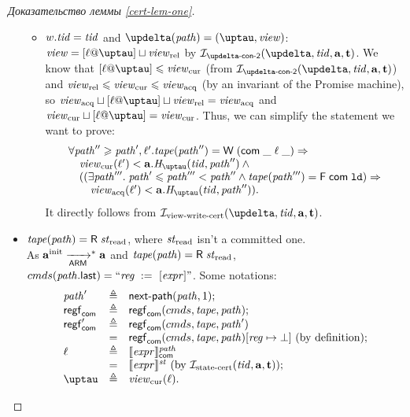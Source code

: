 \begin{proof}[Доказательство леммы \ref{cert-lem-one}]
\begin{itemize}
\begin{itemize}
        \item $w.\mathit{tid} = \mathit{tid}$ and $\delta(\cpath) = (\tau, \R)$: \\
          $\R = [\loc @ \tau] \sqcup \Rrel$ by $\invDeltaDefTwo(\delta, \tId, \aT, \tT)$.
          We know that $[\loc @ \tau] \le \Rcur$ (from $\invDeltaDefTwo(\delta, \tId, \aT, \tT)$) and $\mathit{view}_{\mathrm{rel}} \leqslant \mathit{view}_{\mathrm{cur}} \leqslant \mathit{view}_{\mathrm{acq}}$
          (by an invariant of the Promise machine), so $\Racq \sqcup [\loc @ \tau] \sqcup \Rrel = \Racq$ and
          $\Rcur \sqcup [\loc @ \tau] = \Rcur$.
          Thus, we can simplify the statement we want to prove:
      \[\begin{array}{l}
        \forall \cpath'' \ge \cpath', \loc'. \tape(\cpath'') = \tapeWrite{(\tapeWriteCommitted{\_}{\loc}{\_})} \Rightarrow \\
        \quad \Rcur(\loc') < \aT.\tmap(\tId, \cpath'') \land {} \\
        \quad ((\exists \cpath'''. \; \cpath' \le \cpath''' < \cpath'' \land 
             \tape(\cpath''') = \tapeFence{\Committed}{\LD}) \Rightarrow \\
        \qquad \Racq(\loc') < \aT.\tmap(\tId, \cpath'')).\\
      \end{array}\]
      It directly follows from $\invViewWriteCERT(\delta, \tId, \aT, \tT)$.

      \end{itemize}
      
    \item $\tape(\cpath) = \tapeRead{\Rstate}$, where $\mathit{st}_{\textup{\rm read}}$ isn't a committed one. \\
      As $\mathbf{a}^{\rm init} \xrightarrow[\mathsf{ARM}]{}^{*} \mathbf{a}$ and $\tape(\cpath) = \tapeRead{\Rstate}$,
      ${cmds}(\mathit{path}.\textup{\sf last}) = ``\mathit{reg} \;:=_{}\;[\mathit{expr}]"$.
      Some notations:
      \[\begin{array}{l l l}
        \cpath'    & \triangleq & \nextPath{\cpath}{1}; \\
        \regstcom  & \triangleq & \regstcom(\Cprom, \tape, \cpath); \\
        \regstcom' & \triangleq & \regstcom(\Cprom, \tape, \cpath') \\
                   & =          & \regstcom(\Cprom, \tape, \cpath)[\reg \mapsto \bot] \text{ (by definition)}; \\
        \loc       & \triangleq & \semfcom{\expr}{\cpath} \\
                   & =          & \semf{\expr}{\PromState} \text{ (by $\invStateCERT(\tId, \aT, \tT)$)}; \\
        \tau       & \triangleq & \Rcur(\loc). \\
      \end{array}\]


\end{itemize}
\end{proof}

